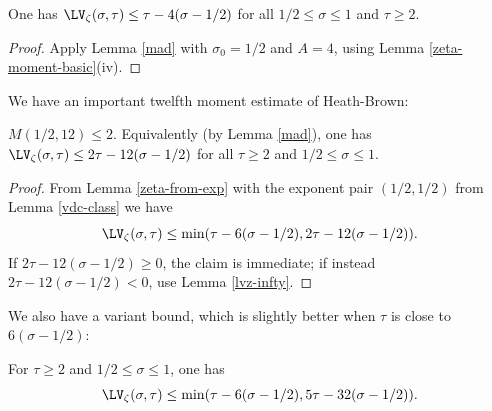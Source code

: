 \begin{corollary}\label{lvz-4} One has $\LV_\zeta(\sigma,\tau) \leq \tau - 4 (\sigma-1/2)$ for all $1/2 \leq \sigma \leq 1$ and $\tau \geq 2$.
\end{corollary}

\begin{proof} Apply Lemma \ref{mad} with $\sigma_0 = 1/2$ and $A=4$, using Lemma \ref{zeta-moment-basic}(iv).
\end{proof}

We have an important twelfth moment estimate of Heath-Brown:

\begin{theorem}\label{hb-12}\cite{heathbrown_twelfth_1978} $M(1/2,12) \leq 2$.  Equivalently (by Lemma \ref{mad}), one has $\LV_\zeta(\sigma,\tau) \leq 2\tau - 12 (\sigma-1/2)$ for all $\tau \geq 2$ and $1/2 \leq \sigma \leq 1$.
\end{theorem}

\begin{proof}  From Lemma \ref{zeta-from-exp} with the exponent pair $(1/2,1/2)$ from Lemma \ref{vdc-class} we have
$$ \LV_\zeta(\sigma,\tau) \leq \min( \tau - 6(\sigma-1/2), 2\tau - 12 (\sigma-1/2) ).$$
If $2\tau - 12 (\sigma-1/2)  \geq 0$, the claim is immediate; if instead $2\tau - 12 (\sigma-1/2) < 0$, use Lemma \ref{lvz-infty}.
\end{proof}

We also have a variant bound, which is slightly better when $\tau$ is close to $6(\sigma-1/2)$:

\begin{theorem}\label{hb-12-aux}  For $\tau \geq 2$ and $1/2 \leq \sigma \leq 1$, one has
$$ \LV_\zeta(\sigma,\tau) \leq \min( \tau-6(\sigma-1/2), 5\tau-32(\sigma-1/2)).$$
\end{theorem}

